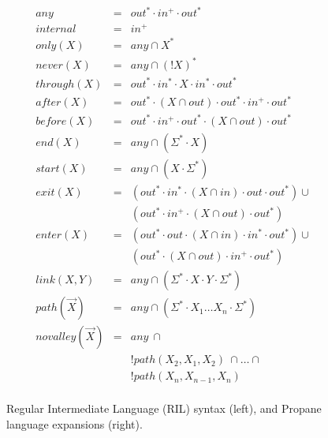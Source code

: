 \begin{figure}
\begin{minipage}[t]{.45\linewidth}
  \end{minipage}
  ~~
  \vrule
  ~~
  \begin{minipage}[t]{.5\linewidth}
  \vspace*{-1\baselineskip}
  \[ \begin{array}{rcl}
    \hline
    any           & = & out^* \cdot in^+ \cdot out^* \\
    internal      & = & in^+ \\
    only(X)       & = & any \cap X^* \\
    never(X)      & = & any \cap (!X)^* \\
    through(X)    & = & out^* \cdot in^* \cdot X \cdot in^* \cdot out^* \\
    after(X)      & = & out^* \cdot (X \cap out) \cdot out^* \cdot in^+ \cdot out^* \\
    before(X)     & = & out^* \cdot in^+ \cdot out^* \cdot (X \cap out) \cdot out^* \\
    end(X)        & = & any \cap (\Sigma^* \cdot X) \\
    start(X)      & = & any \cap (X \cdot \Sigma^*) \\
    exit(X)       & = & (out^* \cdot in^* \cdot (X \cap in) \cdot out \cdot out^*) \cup \\
                  &        & (out^* \cdot in^+ \cdot (X \cap out) \cdot out^*) \\
    enter(X)      & = & (out^* \cdot out \cdot (X \cap in) \cdot in^* \cdot out^*) \cup \\
                  &        & (out^* \cdot (X \cap out) \cdot in^+ \cdot out^*) \\
    link(X,Y)     & = & any \cap (\Sigma^* \cdot X \cdot Y \cdot \Sigma^*) \\
    path(\vec{X}) & = & any \cap (\Sigma^* \cdot X_1 \dots X_n \cdot \Sigma^*) \\
    novalley(\vec{X}) & = & any ~ \cap \\
                  &   & !path(X_2,X_1,X_2) ~ \cap \dots \cap \\
                  &   & !path(X_n,X_{n-1},X_n) \\
  \end{array} \]

  \end{minipage}

  \hrulefill

  \caption{Regular Intermediate Language (RIL) syntax (left), and
           Propane language expansions (right).}
  \label{fig:rir-syntax}
\end{figure}


